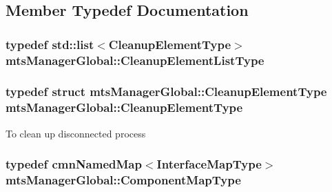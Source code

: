 \subsection{Member Typedef Documentation}
\hypertarget{classmts_manager_global_a2e81b6e4dd89cef56e621cac95944bfd}{
\subsubsection[{Cleanup\-Element\-List\-Type}]{\setlength{\rightskip}{0pt plus 5cm}typedef std\-::list$<${\bf Cleanup\-Element\-Type}$>$ {\bf mts\-Manager\-Global\-::\-Cleanup\-Element\-List\-Type}\hspace{0.3cm}{\ttfamily [protected]}}}\label{classmts_manager_global_a2e81b6e4dd89cef56e621cac95944bfd}
\hypertarget{classmts_manager_global_a52d8af643eef029ad83e5e430604261a}{
\subsubsection[{Cleanup\-Element\-Type}]{\setlength{\rightskip}{0pt plus 5cm}typedef struct {\bf mts\-Manager\-Global\-::\-Cleanup\-Element\-Type}  {\bf mts\-Manager\-Global\-::\-Cleanup\-Element\-Type}\hspace{0.3cm}{\ttfamily [protected]}}}\label{classmts_manager_global_a52d8af643eef029ad83e5e430604261a}
To clean up disconnected process \hypertarget{classmts_manager_global_ab954b59b5453e8c20301f3772bb1484f}{
\subsubsection[{Component\-Map\-Type}]{\setlength{\rightskip}{0pt plus 5cm}typedef {\bf cmn\-Named\-Map}$<${\bf Interface\-Map\-Type}$>$ {\bf mts\-Manager\-Global\-::\-Component\-Map\-Type}\hspace{0.3cm}{\ttfamily [protected]}}}\label{classmts_manager_global_ab954b59b5453e8c20301f3772bb1484f}
